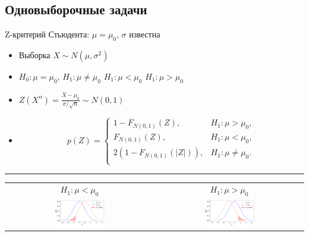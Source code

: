 \documentclass[11pt,pdf,utf8,hyperref={unicode},aspectratio=169]{beamer}
\begin{document}
\subsection{Одновыборочные задачи}

\begin{frame}[label=ztest1]{\hyperlink{onesample}{} Z-критерий Стьюдента: $\mu=\mu_0$, $\sigma$ известна }
    \begin{itemize}
        \item Выборка $X \sim N\left(\mu, \sigma^2\right)$
        \item $H_0\colon \mu=\mu_0$,
        \qquad
            $H_1\colon \mu \neq \mu_0$
        \quad
        $H_1\colon \mu < \mu_0$
        \quad
        $H_1\colon \mu  > \mu_0$
        \item {}\qquad
        \alert{$\displaystyle
        Z\left(X^n\right) = \frac{\bar{X}-\mu_0}{\sigma / \sqrt{n}}  \sim N(0,1)
        $}
        \item {}
        $$
        p\left(Z\right) = \begin{cases}
            1-F_{N(0,1)}(Z), & H_1 \colon \mu>\mu_0, \\
            F_{N(0,1)}(Z), & H_1 \colon \mu < \mu_0, \\
            2\left(1-F_{N(0,1)}(|Z|)\right), & H_1 \colon \mu\neq\mu_0. \\
        \end{cases}
        $$
    \end{itemize}
    \medskip
    \hrule
    \medskip
    \centering
    \begin{tabular}{cc}
        $ H_1 \colon \mu<\mu_0$ & $ H_1 \colon \mu>\mu_0$
        \tabularnewline
        \includegraphics[width=0.35\textwidth]{z_less.png} &
        \includegraphics[width=0.35\textwidth]{z_more.png}
        \tabularnewline
    \end{tabular}
\end{frame}
\end{document}
